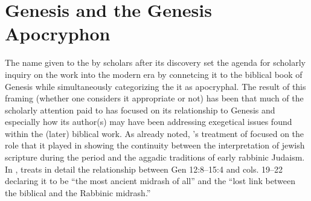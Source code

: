 \section{Genesis and the Genesis Apocryphon}

The name given to the \ga by scholars after its discovery set the agenda for scholarly inquiry on the work into the modern era by connetcing it to the biblical book of Genesis while simultaneously categorizing the it as apocryphal. The result of this framing (whether one considers it appropriate or not) has been that much of the scholarly attention paid to \ga has focused on its relationship to Genesis and especially how its author(s) may have been addressing exegetical issues found within the (later) biblical work. As already noted, \vermes's treatment of \ga focused on the role that it played in showing the continuity between the interpretation of jewish scripture during the \secondtemple period and the aggadic traditions of early rabbinic Judaism. In \cite*{vermes1961}, \vermes treats in detail the relationship between Gen 12:8--15:4 and cols. 19--22 declaring it to be ``the most ancient midrash of all''\autocite[124]{vermes1961} and the ``lost link between the biblical and the Rabbinic midrash.'' \autocite[124]{vermes1961}